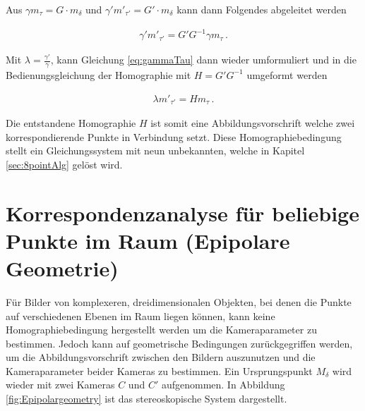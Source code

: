 Aus $\gamma m_\tau = G\cdot m_\delta$ und $\gamma' m'_{\tau'} = G'\cdot m_{\delta}$ kann dann Folgendes abgeleitet werden\cite{Elements}

\begin{gather}
	\gamma' m'_{\tau'} = G' G^{-1} \gamma m_\tau \, .\label{eq:gammaTau}
\end{gather}

Mit $\lambda= \frac{\gamma'}{\gamma}$, kann Gleichung \ref{eq:gammaTau} dann wieder umformuliert und in die Bedienungsgleichung der Homographie mit $H=G' G^{-1}$ umgeformt werden

\begin{gather}
	\lambda m'_{\tau'} = H m_\tau \, .\label{eq:H}
\end{gather} 


Die entstandene Homographie $H$ ist somit eine Abbildungsvorschrift welche zwei korrespondierende Punkte in Verbindung setzt. %
Diese Homographiebedingung stellt ein Gleichungssystem mit neun unbekannten, welche in Kapitel \ref{sec:8pointAlg} gelöst wird\cite{HZ}.



\section{Korrespondenzanalyse für beliebige Punkte im Raum (Epipolare Geometrie)}
\label{sec:EpiolarContraints}

Für Bilder von komplexeren, dreidimensionalen Objekten, bei denen die Punkte auf verschiedenen Ebenen im Raum liegen können, kann keine Homographiebedingung hergestellt werden um die Kameraparameter zu bestimmen. Jedoch kann auf geometrische Bedingungen zurückgegriffen werden, um die Abbildungsvorschrift zwischen den Bildern auszunutzen und die Kameraparameter beider Kameras zu bestimmen. Ein Ursprungspunkt $M_\delta$ wird wieder mit zwei Kameras $C$ und $C'$ aufgenommen. In Abbildung \ref{fig:Epipolargeometry} ist das stereoskopische System dargestellt.
\pagebreak


